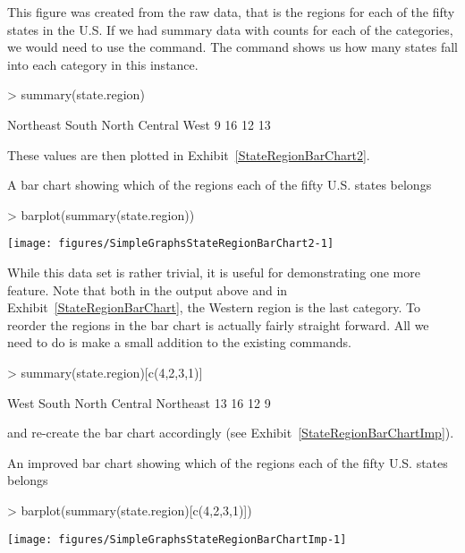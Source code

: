 This figure was created from the raw data, that is the regions for each of the fifty states in the U.S. If we had summary data with counts for each of the categories, we would need to use the  command. The  command shows us how many states fall into each category in this instance. 
\begin{Schunk}
\begin{Sinput}
> summary(state.region) 
\end{Sinput}
\begin{Soutput}
    Northeast         South North Central          West 
            9            16            12            13 
\end{Soutput}
\end{Schunk}
These values are then plotted in Exhibit~\ref{StateRegionBarChart2}. 
\begin{exhibit} 
\begin{center} 
\caption{A bar chart showing which of the regions each of the fifty U.S. states belongs} 
\label{StateRegionBarChart2} 
\begin{Schunk}
\begin{Sinput}
> barplot(summary(state.region)) 
\end{Sinput}

\texttt{[image: figures/SimpleGraphsStateRegionBarChart2-1]} \end{Schunk}
\end{center} 
\end{exhibit} 
 
While this data set is rather trivial, it is useful for demonstrating one more feature. Note that both in the output above and in Exhibit~\ref{StateRegionBarChart}, the Western region is the last category. To reorder the regions in the bar chart is actually fairly straight forward. All we need to do is make a small addition to the existing commands. 
\begin{Schunk}
\begin{Sinput}
> summary(state.region)[c(4,2,3,1)] 
\end{Sinput}
\begin{Soutput}
         West         South North Central     Northeast 
           13            16            12             9 
\end{Soutput}
\end{Schunk}
and re-create the bar chart accordingly (see Exhibit~\ref{StateRegionBarChartImp}). 
\begin{exhibit} 
\begin{center} 
\caption{An improved bar chart showing which of the regions each of the fifty U.S. states belongs} 
\label{StateRegionBarChartImp} 
\begin{Schunk}
\begin{Sinput}
> barplot(summary(state.region)[c(4,2,3,1)]) 
\end{Sinput}

\texttt{[image: figures/SimpleGraphsStateRegionBarChartImp-1]} \end{Schunk}
\end{center} 
\end{exhibit} 
 
